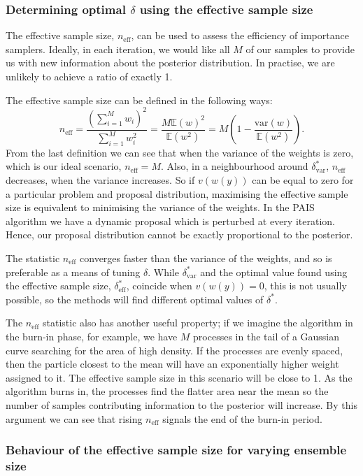 \documentclass[final]{siamltex}
\newcommand{\neff}{n_{\text{eff}}}
\newcommand{\E}{{\mathbb E}}
\begin{document}
\subsubsection{Determining optimal $\delta$ using the effective sample size}\label{sec:ess}

The effective sample size, $\neff$, can be used to assess the efficiency of importance samplers. Ideally, in each iteration, we would like all $M$ of our samples to provide us with new information about the posterior distribution. In practise, we are unlikely to achieve a ratio of exactly 1.

The effective sample size can be defined in the following ways:
\[
	\neff = \frac{\left(\sum_{i=1}^M \! w_i\right)^2}{\sum_{i=1}^M \! w_i^2} = \frac{M\E(w)^2}{\E(w^2)} = M\left(1 - \frac{\mbox{var}(w)}{\mathbb{E}(w^2)}\right).
\]
From the last definition we can see that when the variance of the weights is zero, which is our ideal scenario, $\neff = M$. Also, in a neighbourhood around $\delta_{\text{var}}^*$, $\neff$ decreases, when the variance increases. So if $v(w(y))$ can be equal to zero for a particular problem and proposal distribution, maximising the effective sample size is equivalent to minimising the variance of the weights. In the PAIS algorithm we have a dynamic proposal which is perturbed at every iteration. Hence, our proposal distribution cannot be exactly proportional to the posterior.

The statistic $\neff$ converges faster than the variance of the weights, and so is preferable as a means of tuning $\delta$. While $\delta_{\text{var}}^*$ and the optimal value found using the effective sample size, $\delta_{\text{eff}}^*$, coincide when $v(w(y)) = 0$, this is not usually possible, so the methods will find different optimal values of $\delta^*$.

The $\neff$ statistic also has another useful property; if we imagine the algorithm in the burn-in phase, for example, we have $M$ processes in the tail of a Gaussian curve searching for the area of high density. If the processes are evenly spaced, then the particle closest to the mean will have an exponentially higher weight assigned to it. The effective sample size in this scenario will be close to 1. As the algorithm burns in, the processes find the flatter area near the mean so the number of samples contributing information to the posterior will increase. By this argument we can see that rising $\neff$ signals the end of the burn-in period.

\subsubsection{Behaviour of the effective sample size for varying ensemble size}
\end{document}

